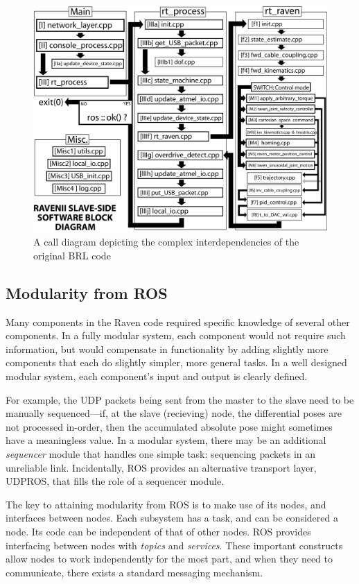\documentclass[letterpaper,twocolumn,10pt]{article}
\begin{document}
\begin{figure}[h]
  \includegraphics[scale=0.33]{RavenII_Block_Diagram.jpg}
  \caption{A call diagram depicting the complex interdependencies of the original BRL code}
  \label{fig:block_diagram}
\end{figure}

\subsection{Modularity from ROS}

Many components in the Raven code required specific knowledge of
several other components. In a fully modular system, each component
would not require such information, but would compensate in
functionality by adding slightly more components that each do slightly
simpler, more general tasks. In a well designed modular system, each
component's input and output is clearly defined.

For example, the UDP packets being sent from the master to the slave
need to be manually sequenced---if, at the slave (recieving) node, the
differential poses are not processed in-order, then the accumulated
absolute pose might sometimes have a meaningless value. In a modular
system, there may be an additional \emph{sequencer} module that
handles one simple task: sequencing packets in an unreliable
link. Incidentally, ROS provides an alternative transport layer, 
UDPROS, that fills the role of a sequencer module.

The key to attaining modularity from ROS is to make use of its nodes, 
and interfaces between nodes. Each subsystem has a task, and can be 
considered a node. Its code can be independent of that of other nodes. 
ROS provides interfacing between nodes with \emph{topics} and 
\emph{services}. These important constructs allow nodes to work 
independently for the most part, and when they need to communicate, 
there exists a standard messaging mechanism.
\end{document}
